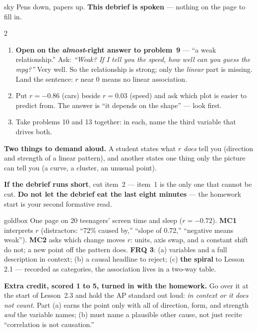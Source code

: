 \documentclass[10pt]{article}
\begin{document}
\boxguard
\begin{skillbox}{sky}
Pens down, papers up. \textbf{This debrief is spoken} --- nothing on the page to fill in.
\begin{multicols}{2}
\begin{enumerate}[leftmargin=1.3em, nosep, itemsep=3pt]
  \item \textbf{Open on the \emph{almost}-right answer to problem~9} --- ``a weak relationship.''
        Ask: \emph{``Weak? If I tell you the speed, how well can you guess the mpg?''} Very
        well. So the relationship is strong; only the \emph{linear} part is missing. Land
        the sentence: $r$ near 0 means no linear association.
  \item Put $r = -0.86$ (cars) beside $r = 0.03$ (speed) and ask which plot is easier to
        predict from. The answer is ``it depends on the shape'' --- look first.
  \item Take problems 10 and 13 together: in each, name the third variable that drives both.
\end{enumerate}
\columnbreak
\textbf{Two things to demand aloud.} A student states what $r$ \emph{does} tell you (direction
and strength of a linear pattern), and another states one thing only the picture can tell you
(a curve, a cluster, an unusual point).

\textbf{If the debrief runs short}, cut item~2 --- item~1 is the only one that cannot be cut.
\textbf{Do not let the debrief eat the last eight minutes} --- the homework start is your
second formative read.
\end{multicols}
\end{skillbox}

\boxguard
\begin{skillbox}{goldbox}
One page on 20 teenagers' screen time and sleep ($r = -0.72$). \textbf{MC1} interprets $r$
(distractors: ``72\% caused by,'' ``slope of 0.72,'' ``negative means weak''). \textbf{MC2}
asks which change moves $r$: units, axis swap, and a constant shift do not; a new point off the
pattern does. \textbf{FRQ 3}: (a) variables and a full description in context; (b) a causal
headline to reject; (c) \textbf{the spiral} to Lesson 2.1 --- recorded as categories, the
association lives in a two-way table.

\textbf{Extra credit, scored 1 to 5, turned in with the homework.} Go over it at
the start of Lesson~2.3 and hold the AP standard out loud: \emph{in context or it does not
count}. Part (a) earns the point only with all of direction, form, and strength \emph{and}
the variable names; (b) must name a plausible other cause, not just recite ``correlation is not
causation.''
\end{skillbox}
\end{document}
